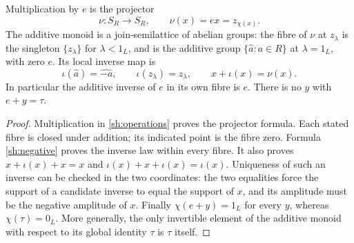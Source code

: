 \begin{proposition}\label{sh:addinverse}
Multiplication by $e$ is the projector
\begin{equation}\tag{SH4}\label{sh:epsilon}
 \nu:S_R\to S_R,\qquad \nu(x)=ex=z_{\chi(x)}.
\end{equation}
The additive monoid is a join-semilattice of abelian groups:
the fibre of $\nu$ at $z_\lambda$ is the singleton $\{z_\lambda\}$
for $\lambda<1_L$, and is the additive group
$\{\widehat a:a\in R\}$ at $\lambda=1_L$, with zero $e$.
Its local inverse map is
\begin{equation}\tag{SH5}\label{sh:negative}
 \iota(\widehat a)=\widehat{-a},\qquad
 \iota(z_\lambda)=z_\lambda,\qquad
 x+\iota(x)=\nu(x).
\end{equation}
In particular the additive inverse of $e$ in its own fibre is $e$.
There is no $y$ with $e+y=\tau$.
\end{proposition}
\begin{proof}
Multiplication in \eqref{sh:operations} proves the projector formula.
Each stated fibre is closed under addition; its indicated point is
the fibre zero. Formula \eqref{sh:negative} proves the inverse law
within every fibre. It also proves $x+\iota(x)+x=x$ and
$\iota(x)+x+\iota(x)=\iota(x)$. Uniqueness of such an inverse
can be checked in the two coordinates: the two equalities force
the support of a candidate inverse to equal the support of $x$,
and its amplitude must be the negative amplitude of $x$.
Finally $\chi(e+y)=1_L$ for every $y$, whereas $\chi(\tau)=0_L$.
More generally, the only invertible element of the additive monoid
with respect to its global identity $\tau$ is $\tau$ itself.
\end{proof}

